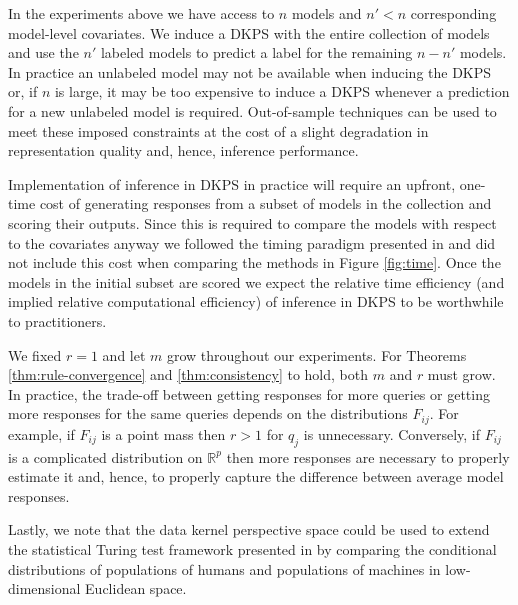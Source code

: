 In the experiments above we have access to $ n $ models and $ n' < n $ corresponding model-level covariates. 
We induce a DKPS with the entire collection of models and use the $ n' $ labeled models to predict a label for the remaining $ n - n' $ models.
In practice an unlabeled model may not be available when inducing the DKPS or, if $ n $ is large, it may be too expensive to induce a DKPS whenever a prediction for a new unlabeled model is required.
Out-of-sample techniques \citep{bengio2003out, trosset2008out} can be used to meet these imposed constraints at the cost of a slight degradation in representation quality and, hence, inference performance.

Implementation of inference in DKPS in practice will require an upfront, one-time cost of generating responses from a subset of models in the collection and scoring their outputs.
Since this is required to compare the models with respect to the covariates anyway we followed the timing paradigm presented in \citep{perlitz2023efficient} and did not include this cost when comparing the methods in Figure \ref{fig:time}.
Once the models in the initial subset are scored we expect the relative time efficiency (and implied relative computational efficiency) of inference in DKPS to be worthwhile to practitioners.

We fixed $ r = 1 $ and let $ m $ grow throughout our experiments. 
For Theorems \ref{thm:rule-convergence} and \ref{thm:consistency} to hold, both $ m $ and $ r $ must grow.
In practice, the trade-off between getting responses for more queries or getting more responses for the same queries depends on the distributions $ F_{ij} $.
For example, if $ F_{ij} $ is a point mass then $ r > 1 $ for $ q_{j} $ is unnecessary.
Conversely, if $ F_{ij} $ is a complicated distribution on $ \mathbb{R}^{p} $ then more responses are necessary to properly estimate it and, hence, to properly capture the difference between average model responses.

Lastly, we note that the data kernel perspective space could be used to extend the statistical Turing test framework presented in \cite{helm2023statisticalturingtestgenerative} by comparing the conditional distributions of populations of humans and populations of machines in low-dimensional Euclidean space.


